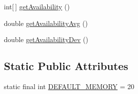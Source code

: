 \begin{DoxyCompactItemize}
\item 
int\mbox{[}$\,$\mbox{]} \hyperlink{classjenes_1_1population_1_1_pool_3_01_t_01extends_01_chromosome_01_4_1_1_statistics_a455fc5da58426bcc4c25fe8e7979abf8}{get\-Availability} ()
\item 
double \hyperlink{classjenes_1_1population_1_1_pool_3_01_t_01extends_01_chromosome_01_4_1_1_statistics_ace10458ff32c6cc303318cc0329c0c15}{get\-Availability\-Avg} ()
\item 
double \hyperlink{classjenes_1_1population_1_1_pool_3_01_t_01extends_01_chromosome_01_4_1_1_statistics_a9b73f95b141e64424fdd89ca2a315c95}{get\-Availability\-Dev} ()
\end{DoxyCompactItemize}
\subsection*{Static Public Attributes}
\begin{DoxyCompactItemize}
\item 
static final int \hyperlink{classjenes_1_1population_1_1_pool_3_01_t_01extends_01_chromosome_01_4_1_1_statistics_ad1e73dcdf30dc520091e6c979128d481}{D\-E\-F\-A\-U\-L\-T\-\_\-\-M\-E\-M\-O\-R\-Y} = 20
\end{DoxyCompactItemize}
